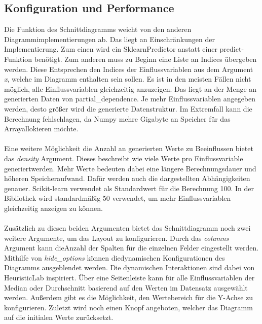\subsection{Konfiguration und Performance}
\label{subsec:pdp_config_performance}
\noindent Die Funktion des Schnittdiagramms weicht von den anderen Diagrammimplementierungen ab. Das liegt an Einschränkungen der Implementierung. Zum einen wird ein SklearnPredictor anstatt einer predict-Funktion benötigt. Zum anderen muss zu Beginn eine Liste an Indices übergeben werden. Diese Entsprechen den Indices der Einflussvariablen aus dem Argument \emph{x}, welche im Diagramm enthalten sein sollen. Es ist in den meisten Fällen nicht möglich, alle Einflussvariablen gleichzeitig anzuzeigen. Das liegt an der Menge an generierten Daten von partial\_dependence. Je mehr Einflussvariablen angegeben werden, desto größer wird die generierte Datenstruktur. Im Extremfall kann die Berechnung fehlschlagen, da Numpy mehre Gigabyte an Speicher für das Array\linebreak allokieren möchte.\\\\
\noindent Eine weitere Möglichkeit die Anzahl an generierten Werte zu Beeinflussen bietet das \emph{density} Argument. Dieses beschreibt wie viele Werte pro Einflussvariable generiert\linebreak werden. Mehr Werte bedeuten dabei eine längere Berechnungsdauer und höheren Speicheraufwand. Dafür werden auch die dargestellten Abhängigkeiten genauer. Scikit-learn verwendet als Standardwert für die Berechnung 100. In der Bibliothek wird standardmäßig 50 verwendet, um mehr Einflussvariablen gleichzeitig anzeigen zu können.\\\\
\noindent Zusätzlich zu diesen beiden Argumenten bietet das Schnittdiagramm noch zwei weitere Argumente, um das Layout zu konfigurieren. Durch das \emph{columns} Argument kann die\linebreak Anzahl der Spalten für die einzelnen Felder eingestellt werden. Mithilfe von \emph{hide\_options} können die\linebreak dynamischen Konfigurationen des Diagramms ausgeblendet werden. Die dynamischen Interaktionen sind dabei von HeuristicLab inspiriert. Über eine Seitenleiste kann für alle Einflussvariablen der Median oder Durchschnitt basierend auf den Werten im Datensatz ausgewählt werden. Außerdem gibt es die Möglichkeit, den Wertebereich für die Y-Achse zu konfigurieren. Zuletzt wird noch einen Knopf angeboten, welcher das Diagramm auf die initialen Werte zurücksetzt.

